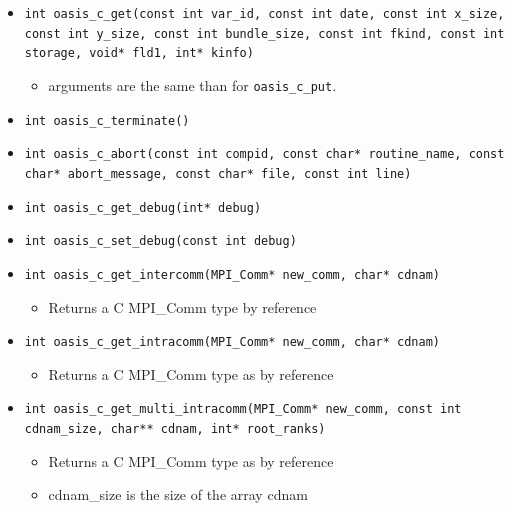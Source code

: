 \begin{itemize}
\vspace{0.2cm}
\item {\tt int oasis\_c\_get(const int var\_id, const int date, const
  int x\_size, const int y\_size, const int bundle\_size, const int
  fkind, const int storage, void* fld1, int* kinfo)}
  \begin{itemize}
  \item arguments are the same than for {\tt oasis\_c\_put}.
  \end{itemize}

\vspace{0.2cm}
\item {\tt int oasis\_c\_terminate()}

\vspace{0.2cm}
\item {\tt int oasis\_c\_abort(const int compid, const char* routine\_name, const char* abort\_message, const char* file, const int line)}

\vspace{0.2cm}
\item {\tt int oasis\_c\_get\_debug(int* debug)}

\vspace{0.2cm}
\item {\tt int oasis\_c\_set\_debug(const int debug)}

\vspace{0.2cm}
\item {\tt int oasis\_c\_get\_intercomm(MPI\_Comm* new\_comm, char* cdnam)}
  \begin{itemize}
  \item Returns a C MPI\_Comm type by reference
  \end{itemize}

\vspace{0.2cm}
\item {\tt int oasis\_c\_get\_intracomm(MPI\_Comm* new\_comm, char* cdnam)}
  \begin{itemize}
  \item Returns a C MPI\_Comm type as by reference
  \end{itemize}

\vspace{0.2cm}
\item {\tt int oasis\_c\_get\_multi\_intracomm(MPI\_Comm* new\_comm, const int cdnam\_size, char** cdnam, int* root\_ranks)}
  \begin{itemize}
  \item Returns a C MPI\_Comm type as by reference
  \item cdnam\_size is the size of the array cdnam
  \end{itemize}


\end{itemize}
